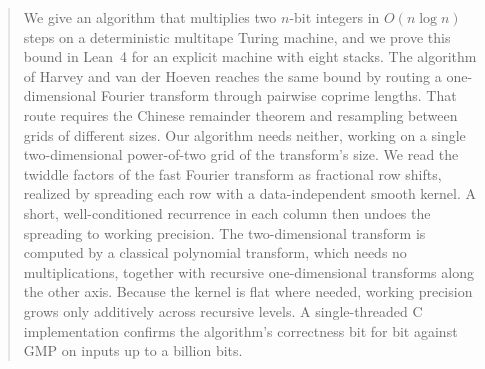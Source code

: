 \begin{abstract}
We give an algorithm that multiplies two $n$-bit integers in $O(n \log n)$ steps on a deterministic multitape Turing machine, and we prove this bound in Lean~4 for an explicit machine with eight stacks. The algorithm of Harvey and van der Hoeven reaches the same bound by routing a one-dimensional Fourier transform through pairwise coprime lengths. That route requires the Chinese remainder theorem and resampling between grids of different sizes. Our algorithm needs neither, working on a single two-dimensional power-of-two grid of the transform's size. We read the twiddle factors of the fast Fourier transform as fractional row shifts, realized by spreading each row with a data-independent smooth kernel. A short, well-conditioned recurrence in each column then undoes the spreading to working precision. The two-dimensional transform is computed by a classical polynomial transform, which needs no multiplications, together with recursive one-dimensional transforms along the other axis. Because the kernel is flat where needed, working precision grows only additively across recursive levels. A single-threaded C implementation confirms the algorithm's correctness bit for bit against GMP on inputs up to a billion bits.
\end{abstract}

